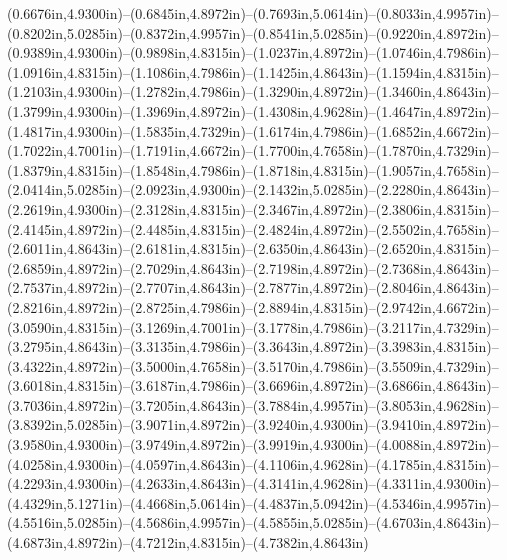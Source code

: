 (0.6676in,4.9300in)--(0.6845in,4.8972in)--(0.7693in,5.0614in)--(0.8033in,4.9957in)--(0.8202in,5.0285in)--(0.8372in,4.9957in)--(0.8541in,5.0285in)--(0.9220in,4.8972in)--(0.9389in,4.9300in)--(0.9898in,4.8315in)--(1.0237in,4.8972in)--(1.0746in,4.7986in)--(1.0916in,4.8315in)--(1.1086in,4.7986in)--(1.1425in,4.8643in)--(1.1594in,4.8315in)--(1.2103in,4.9300in)--(1.2782in,4.7986in)--(1.3290in,4.8972in)--(1.3460in,4.8643in)--(1.3799in,4.9300in)--(1.3969in,4.8972in)--(1.4308in,4.9628in)--(1.4647in,4.8972in)--(1.4817in,4.9300in)--(1.5835in,4.7329in)--(1.6174in,4.7986in)--(1.6852in,4.6672in)--(1.7022in,4.7001in)--(1.7191in,4.6672in)--(1.7700in,4.7658in)--(1.7870in,4.7329in)--(1.8379in,4.8315in)--(1.8548in,4.7986in)--(1.8718in,4.8315in)--(1.9057in,4.7658in)--(2.0414in,5.0285in)--(2.0923in,4.9300in)--(2.1432in,5.0285in)--(2.2280in,4.8643in)--(2.2619in,4.9300in)--(2.3128in,4.8315in)--(2.3467in,4.8972in)--(2.3806in,4.8315in)--(2.4145in,4.8972in)--(2.4485in,4.8315in)--(2.4824in,4.8972in)--(2.5502in,4.7658in)--(2.6011in,4.8643in)--(2.6181in,4.8315in)--(2.6350in,4.8643in)--(2.6520in,4.8315in)--(2.6859in,4.8972in)--(2.7029in,4.8643in)--(2.7198in,4.8972in)--(2.7368in,4.8643in)--(2.7537in,4.8972in)--(2.7707in,4.8643in)--(2.7877in,4.8972in)--(2.8046in,4.8643in)--(2.8216in,4.8972in)--(2.8725in,4.7986in)--(2.8894in,4.8315in)--(2.9742in,4.6672in)--(3.0590in,4.8315in)--(3.1269in,4.7001in)--(3.1778in,4.7986in)--(3.2117in,4.7329in)--(3.2795in,4.8643in)--(3.3135in,4.7986in)--(3.3643in,4.8972in)--(3.3983in,4.8315in)--(3.4322in,4.8972in)--(3.5000in,4.7658in)--(3.5170in,4.7986in)--(3.5509in,4.7329in)--(3.6018in,4.8315in)--(3.6187in,4.7986in)--(3.6696in,4.8972in)--(3.6866in,4.8643in)--(3.7036in,4.8972in)--(3.7205in,4.8643in)--(3.7884in,4.9957in)--(3.8053in,4.9628in)--(3.8392in,5.0285in)--(3.9071in,4.8972in)--(3.9240in,4.9300in)--(3.9410in,4.8972in)--(3.9580in,4.9300in)--(3.9749in,4.8972in)--(3.9919in,4.9300in)--(4.0088in,4.8972in)--(4.0258in,4.9300in)--(4.0597in,4.8643in)--(4.1106in,4.9628in)--(4.1785in,4.8315in)--(4.2293in,4.9300in)--(4.2633in,4.8643in)--(4.3141in,4.9628in)--(4.3311in,4.9300in)--(4.4329in,5.1271in)--(4.4668in,5.0614in)--(4.4837in,5.0942in)--(4.5346in,4.9957in)--(4.5516in,5.0285in)--(4.5686in,4.9957in)--(4.5855in,5.0285in)--(4.6703in,4.8643in)--(4.6873in,4.8972in)--(4.7212in,4.8315in)--(4.7382in,4.8643in)
